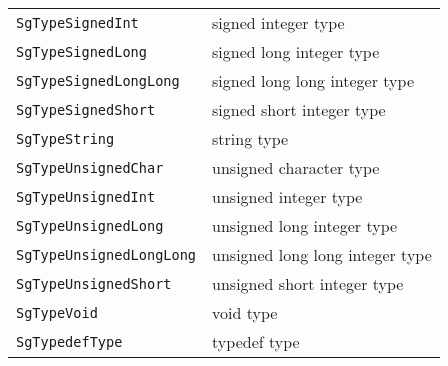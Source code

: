 \begin{longtable}[l]{l|p{10cm}}
 \texttt{SgTypeSignedInt}& signed integer type\\
 \texttt{SgTypeSignedLong}& signed long integer type\\
 \texttt{SgTypeSignedLongLong}& signed long long integer type\\
 \texttt{SgTypeSignedShort}& signed short integer type\\
 \texttt{SgTypeString}& string type\\
 \texttt{SgTypeUnsignedChar}&unsigned character type\\
 \texttt{SgTypeUnsignedInt}&unsigned integer type\\
 \texttt{SgTypeUnsignedLong}&unsigned long integer type\\
 \texttt{SgTypeUnsignedLongLong}&unsigned long long integer type\\
 \texttt{SgTypeUnsignedShort}&unsigned short integer type\\
 \texttt{SgTypeVoid}&void type\\
 \texttt{SgTypedefType}&typedef type\\
\end{longtable}

